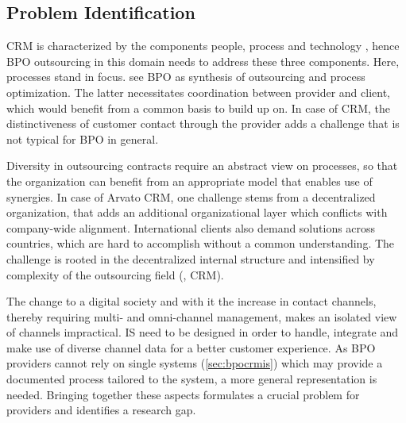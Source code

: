\subsection{Problem Identification}
\label{sec:proide}
CRM is characterized by the components people, process and technology \citep{Chen_2003}, hence BPO outsourcing in this domain needs to address these three components. Here, processes stand in focus. \cite{schewe2007} see BPO as synthesis of outsourcing and process optimization. The latter necessitates coordination between provider and client, which would benefit from a common basis to build up on. In case of CRM, the distinctiveness of customer contact through the provider adds a challenge that is not typical for BPO in general. 

Diversity in outsourcing contracts require an abstract view on processes, so that the organization can benefit from an appropriate model that enables use of synergies. In case of Arvato CRM, one challenge stems from a decentralized organization, that adds an additional organizational layer which conflicts with company-wide alignment. International clients also demand solutions across countries, which are hard to accomplish without a common understanding. The challenge is rooted in the decentralized internal structure and intensified by complexity of the outsourcing field (\eg, \acrshort{CRM}).

The change to a digital society and with it the increase in contact channels, thereby requiring multi- and omni-channel management, makes an isolated view of channels impractical. \acrshort{IS} need to be designed in order to handle, integrate and make use of diverse channel data for a better customer experience. As BPO providers cannot rely on single systems (\cf \ref{sec:bpocrmis}) which may provide a documented process tailored to the system, a more general representation is needed. Bringing together these aspects formulates a crucial problem for providers and identifies a research gap. 


